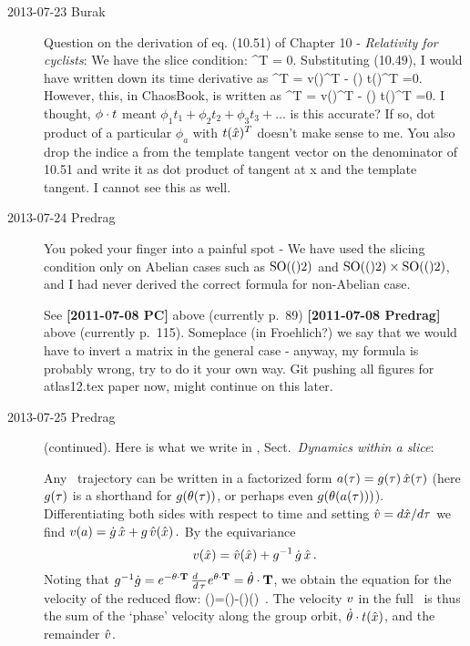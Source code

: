 \begin{description}
\item[2013-07-23  Burak] Question on the derivation of eq. (10.51) of  {Chapter 10} - {\em Relativity for cyclists}: We have the slice condition:
\beq
 \sspRed^T  = 0.
\eeq
Substituting (10.49), I would have written down its time derivative as
\beq
 \velRed^T  = v(\sspRed)^T  - \dot{\phi}(\sspRed) \cdot t(\sspRed)^T =0.
\eeq
However, this, in ChaosBook, is written as
\beq
 \velRed^T  = v(\sspRed)^T  - (\sspRed) \cdot t(\sspRed)^T =0.
\eeq
I thought, $\phi \cdot t$ meant $\phi_1 t_1 + \phi_2 t_2 + \phi_3 t_3 + ... $ is this accurate? If so, dot product of a particular $\phi_a$ with $t(\hat{x})^T$ doesn't make sense to me. You also drop the indice a from the template tangent vector on the denominator of 10.51 and write it as dot product of tangent at x and the template tangent. I cannot see this
as well.

\item[2013-07-24  Predrag]
You poked your finger into a painful spot - We have used the
slicing condition only on Abelian cases such as $\textrm{SO}(()2)$ and
$\textrm{SO}(()2)\times\textrm{SO}(()2)$, and I had never derived the correct formula for
non-Abelian case.

See
{\bf [2011-07-08 PC]} above (currently p.~89)
{\bf [2011-07-08 Predrag]} above (currently p.~115).
Someplace (in Froehlich?) we say that we would have to invert a matrix in
the general case - anyway, my formula is probably wrong, try to do it
your own way. Git pushing all figures for atlas12.tex paper now, might
continue on this later.

\item[2013-07-25  Predrag] (continued). Here is what we write in
, Sect.~{\em Dynamics within a slice}:

Any \statesp\ trajectory can be written in a factorized
form $a(\tau)=g(\tau)\,\hat{x}(\tau)$
(here $g(\tau)$ is a shorthand for $g(\theta(\tau))$,
or perhaps even $g(\theta(a(\tau)))$).
Differentiating both sides with respect to time and
setting $\hat{v}={d\hat{x}}/{d\tau}$ we find
\(
v(a)=\dot{g} \, \hat{x}+g \, \hat{v}(\hat{x})
\,.
\)
By the equivariance %
\[
v(\hat{x})=\hat{v}(\hat{x}) + g^{-1} \, \dot{g} \, \hat{x}
\,.
\]
Noting that $g^{-1}\dot{g}=e^{-\theta \cdot \mathbf{T}} \,
\frac{d ~~}{d \, \tau} e^{\theta \cdot \mathbf{T}}=\dot{\theta}\cdot \mathbf{T}$,
we obtain the equation for the velocity of the reduced flow:
\beq
\velRed(\sspRed)=\vel(\sspRed)-\dot{\gSpace}(\sspRed)\cdot \groupTan(\sspRed)
\,.
The velocity $v$ in the full \statesp\ is thus the sum of the
`phase' velocity %
along the group orbit, $\dot{\theta} \cdot t(\hat{x})$,
and the remainder $\hat{v}$.


\end{description}
